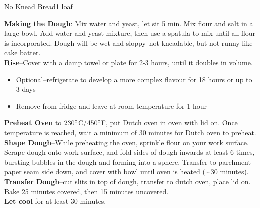 \begin{recipe}{No Knead Bread}{1 loaf}{}


    \textbf{Making the Dough}: Mix water and yeast, let sit 5 min. Mix flour and salt in a large bowl. Add water and yeast mixture, then use a spatula to mix until all flour is incorporated. Dough will be wet and sloppy--not kneadable, but not runny like cake batter.\\

    \textbf{Rise}--Cover with a damp towel or plate for 2-3 hours, until it doubles in volume.
    \begin{itemize}
        \item Optional--refrigerate to develop a more complex flavour for 18 hours or up to 3 days
        \item Remove from fridge and leave at room temperature for 1 hour
    \end{itemize}

    \textbf{Preheat Oven} to $230\degree$C/$450\degree$F, put Dutch oven in oven with lid on. Once temperature is reached, wait a minimum of 30 minutes for Dutch oven to preheat.\\

    \textbf{Shape Dough}--While preheating the oven, sprinkle flour on your work surface. Scrape dough onto work surface, and fold sides of dough inwards at least 6 times, bursting bubbles in the dough and forming into a sphere. Transfer to parchment paper seam side down, and cover with bowl until oven is heated ($\sim 30$ minutes).\\

    \textbf{Transfer Dough}--cut slits in top of dough, transfer to dutch oven, place lid on. Bake 25 minutes covered, then 15 minutes uncovered.\\

    \textbf{Let cool} for at least 30 minutes.
\end{recipe}